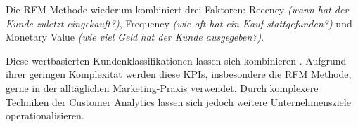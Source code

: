 Die RFM-Methode \cite{fader2004} wiederum kombiniert drei Faktoren: Recency \textit{(wann hat der Kunde zuletzt eingekauft?)}, Frequency \textit{(wie oft hat ein Kauf stattgefunden?)} und Monetary Value \textit{(wie viel Geld hat der Kunde ausgegeben?)}.

Diese wertbasierten Kundenklassifikationen lassen sich kombinieren \cite{fader2004}.
Aufgrund ihrer geringen Komplexität werden diese KPIs, insbesondere die RFM Methode, gerne in der alltäglichen Marketing-Praxis verwendet. Durch komplexere Techniken der Customer Analytics lassen sich jedoch weitere Unternehmensziele operationalisieren.